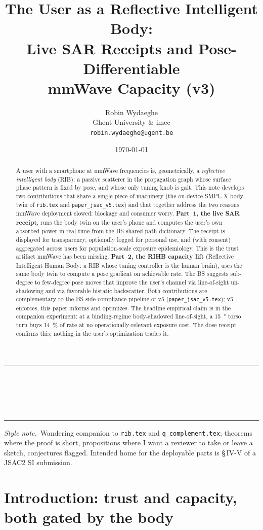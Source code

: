 \documentclass[11pt,a4paper]{article}
\title{\textbf{The User as a Reflective Intelligent Body:\\
Live SAR Receipts and Pose-Differentiable\\
mmWave Capacity (v3)}}
\author{Robin Wydaeghe\\
 Ghent University \& imec\\
 \texttt{robin.wydaeghe@ugent.be}}
\date{\today}
\makeatletter
\theoremstyle{definition}
\renewcommand{\maketitle}{%
  \thispagestyle{plain}%
  \begin{center}
    \rule{\linewidth}{1pt}\\[0.4em]
    {\LARGE\bfseries \@title}\\[0.5em]
    {\large \@author}\\[0.3em]
    {\small \@date}\\[0.4em]\rule{\linewidth}{1pt}
  \end{center}
  \vspace{0.5em}
}
\makeatother
\begin{document}
\maketitle

\begin{abstract}
A user with a smartphone at mmWave frequencies is, geometrically, a
\emph{reflective intelligent body} (RIB): a passive scatterer in the
propagation graph whose surface phase pattern is fixed by pose, and
whose only tuning knob is gait.  This note develops two contributions
that share a single piece of machinery (the on-device SMPL-X body twin
of \texttt{rib.tex} and \texttt{paper\_jsac\_v5.tex}) and that
together address the two reasons mmWave deployment slowed: blockage
and consumer worry.  \textbf{Part~1, the live SAR receipt}, runs the
body twin on the user's phone and computes the user's own absorbed
power in real time from the BS-shared path dictionary.  The receipt
is displayed for transparency, optionally logged for personal use,
and (with consent) aggregated across users for population-scale
exposure epidemiology.  This is the trust artifact mmWave has been
missing.  \textbf{Part~2, the RIHB capacity lift} (Reflective
Intelligent Human Body: a RIB whose tuning controller is the human
brain), uses the same body twin to compute a pose gradient on
achievable rate.  The BS suggests sub-degree to few-degree pose moves
that improve the user's channel via line-of-sight un-shadowing and
via favorable bistatic backscatter.  Both contributions are
complementary to the BS-side compliance pipeline of v5
(\texttt{paper\_jsac\_v5.tex}); v5 enforces, this paper informs and
optimizes.  The headline empirical claim is in the companion
experiment: at a binding-regime body-shadowed line-of-sight, a
\SI{15}{\degree} torso turn buys \SI{14}{\percent} of rate at no
operationally-relevant exposure cost.  The dose receipt confirms
this; nothing in the user's optimization trades it.
\end{abstract}

\vspace{0.3em}
\noindent\textit{Style note.}~Wandering companion to
\texttt{rib.tex} and \texttt{q\_complement.tex}; theorems where the
proof is short, propositions where I want a reviewer to take or
leave a sketch, conjectures flagged.  Intended home for the
deployable parts is \S\,IV-V of a JSAC2 SI submission.

\tableofcontents
\bigskip

\section{Introduction: trust and capacity, both gated by the body}\label{sec:intro}
\end{document}
